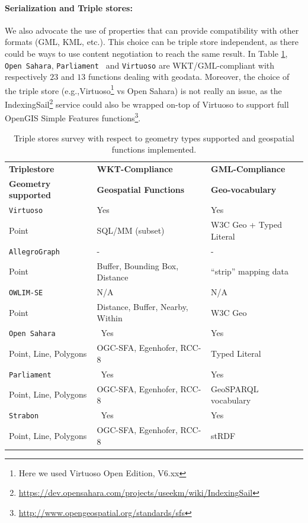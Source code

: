 \paragraph{Serialization and Triple stores:} We also advocate the use of properties that can provide compatibility with other formats (GML, KML, etc.). This choice can be triple store independent, as there could be ways to use content negotiation to reach the same result. In Table \ref{tab:triplestore}, \texttt{Open Sahara}, \texttt{Parliament } and  \texttt{Virtuoso} are WKT/GML-compliant with respectively $23$ and $13$ functions dealing with geodata. Moreover, the choice of the triple store (e.g.,Virtuoso\footnote{Here we used Virtuoso Open Edition, V6.xx} vs Open Sahara) is not really an issue, as the IndexingSail\footnote{\url{https://dev.opensahara.com/projects/useekm/wiki/IndexingSail}} service could also be wrapped on-top of Virtuoso to support full OpenGIS Simple Features functions\footnote{\url{http://www.opengeospatial.org/standards/sfs}}.

\begin{table}[ht!bp]
  \caption{Triple stores survey with respect to geometry types supported and geospatial functions implemented.}
  \label{tab:triplestore}
  \centering
  \begin{tabular}{lll}
    \toprule
    \textbf{Triplestore} & \textbf{WKT-Compliance } &  \textbf{GML-Compliance } \\
    \textbf{Geometry supported} & \textbf{Geospatial Functions} &  \textbf{Geo-vocabulary} \\
    \toprule
    \texttt{Virtuoso} & Yes & Yes \\
    Point & SQL/MM (subset) & W3C Geo + Typed Literal \\
    \midrule
    \texttt{AllegroGraph} & \-- & \-- \\
    Point & Buffer, Bounding Box, Distance & ``strip'' mapping data \\
    \midrule
    \texttt{OWLIM-SE} & N/A & N/A \\
    Point & Distance, Buffer, Nearby, Within & W3C Geo \\
    \midrule
    \texttt{Open Sahara} & \ Yes & Yes \\
    Point, Line, Polygons & OGC-SFA, Egenhofer, RCC-8 & Typed Literal \\
    \midrule
    \texttt{Parliament} & \ Yes & Yes \\
    Point, Line, Polygons & OGC-SFA, Egenhofer, RCC-8 &  GeoSPARQL vocabulary\\
    \midrule
    \texttt{Strabon} & \ Yes & Yes \\
    Point, Line, Polygons & OGC-SFA, Egenhofer, RCC-8 &  stRDF\\
    \bottomrule
  \end{tabular}
\end{table}

